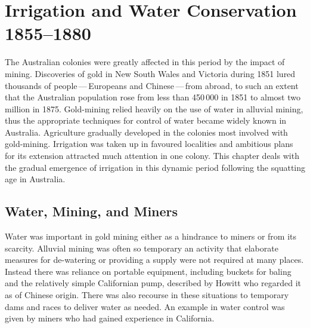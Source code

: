 
\chapter{Irrigation and Water Conservation 1855--1880}

\label{ch:emergence}

\setcounter{endnote}{0}

The Australian colonies were greatly affected in this period by the
impact of mining. Discoveries of gold in New South Wales and Victoria
during 1851 lured thousands of people\,---\,Europeans and
Chinese\,---\,from abroad, to such an extent that the Australian
population rose from less than 450\,000 in 1851 to almost two million
in 1875.  Gold-mining relied heavily on the use of water in alluvial
mining, thus the appropriate techniques for control of water became
widely known in Australia.  Agriculture gradually developed in the
colonies most involved with gold-mining.  Irrigation was taken up in
favoured localities and ambitious plans for its extension attracted
much attention in one colony.  This chapter deals with the gradual
emergence of irrigation in this dynamic period following the squatting
age in Australia.

\section*{Water, Mining, and Miners} 

Water was important in gold mining either as a hindrance to miners or
from its scarcity.  Alluvial  mining was often so
temporary an activity that elaborate measures for de-watering or
providing a supply were not required at many places.  Instead there
was reliance on portable equipment, including buckets for baling and
the relatively simple Californian
pump, described by Howitt who
regarded it as of Chinese origin.
There was also recourse in these situations to temporary
dams and races to deliver water as needed.  An
example in water control was given by miners who had gained experience
in California.

